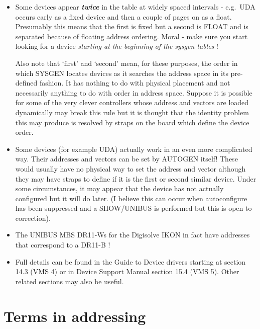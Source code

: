 \begin{itemize}
\item Some devices appear {\bf\it twice} in the table at widely spaced
intervals - e.g.\ UDA occurs early as a fixed device and then
a couple of pages on as a float. Presumably this means that
the first is fixed but a second is FLOAT and is separated because
of floating address ordering. Moral - make sure you start looking
for a device {\it starting at the beginning of the sysgen tables} !

Also note that `first' and `second' mean, for these purposes, the order
in which SYSGEN locates devices as it searches the address space in its
pre-defined fashion.
It has nothing to do with physical placement and not necessarily anything
to do with order in address space.
Suppose it is possible for some of the very clever controllers whose address
and vectors are loaded dynamically may break this rule but it is thought 
that the identity problem this may produce is resolved by straps on the board 
which define the device order.

\item Some devices (for example UDA) actually work in an even more
complicated way.
Their addresses and vectors can be set by AUTOGEN itself!
These would usually have no physical way to set the address and vector 
although they may have straps to define if it is the first or second
similar device.
Under some circumstances, it may appear that the device has not actually 
configured but it will do later.
(I believe this can occur when autoconfigure has been suppressed and a
SHOW/UNIBUS is performed but this is open to correction).

\item The UNIBUS MBS DR11-Ws for the Digisolve IKON in fact have addresses
that correspond to a DR11-B !

\item Full details can be found in the Guide to Device drivers starting
at section 14.3 (VMS 4) or in Device Support Manual section 15.4 (VMS 5).
Other related sections may also be useful.
    
\end{itemize}

\section{Terms in addressing}

